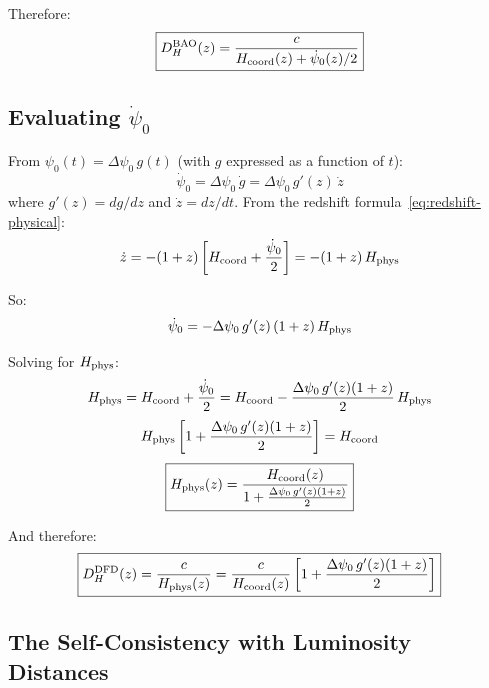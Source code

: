 \documentclass[11pt,a4paper]{article}
\begin{document}
Therefore:
\begin{equation}
\boxed{
D_H^{\rm BAO}(z) = \frac{c}{H_{\rm coord}(z) + \dot{\psi}_0(z)/2}
}
\label{eq:DH-BAO-correct}
\end{equation}

\subsection{Evaluating $\dot{\psi}_0$}

From $\psi_0(t) = \Delta\psi_0\,g(t)$ (with $g$ expressed as a function
of $t$):
\begin{equation}
\dot{\psi}_0 = \Delta\psi_0\,\dot{g} = \Delta\psi_0\,g'(z)\,\dot{z}
\end{equation}
where $g'(z) = dg/dz$ and $\dot{z} = dz/dt$. From the redshift
formula~\eqref{eq:redshift-physical}:
\begin{equation}
\dot{z} = -(1+z)\left[H_{\rm coord} + \frac{\dot{\psi}_0}{2}\right]
= -(1+z)\,H_{\rm phys}
\end{equation}

So:
\begin{equation}
\dot{\psi}_0 = -\Delta\psi_0\,g'(z)\,(1+z)\,H_{\rm phys}
\end{equation}

Solving for $H_{\rm phys}$:
\begin{equation}
H_{\rm phys} = H_{\rm coord} + \frac{\dot{\psi}_0}{2}
= H_{\rm coord} - \frac{\Delta\psi_0\,g'(z)(1+z)}{2}\,H_{\rm phys}
\end{equation}
\begin{equation}
H_{\rm phys}\left[1 + \frac{\Delta\psi_0\,g'(z)(1+z)}{2}\right] = H_{\rm coord}
\end{equation}
\begin{equation}
\boxed{
H_{\rm phys}(z) = \frac{H_{\rm coord}(z)}{1 + \frac{\Delta\psi_0\,g'(z)(1+z)}{2}}
}
\label{eq:H-phys-final}
\end{equation}

And therefore:
\begin{equation}
\boxed{
D_H^{\rm DFD}(z) = \frac{c}{H_{\rm phys}(z)}
= \frac{c}{H_{\rm coord}(z)}\left[1 + \frac{\Delta\psi_0\,g'(z)(1+z)}{2}\right]
}
\label{eq:DH-final}
\end{equation}

\subsection{The Self-Consistency with Luminosity Distances}
\end{document}
